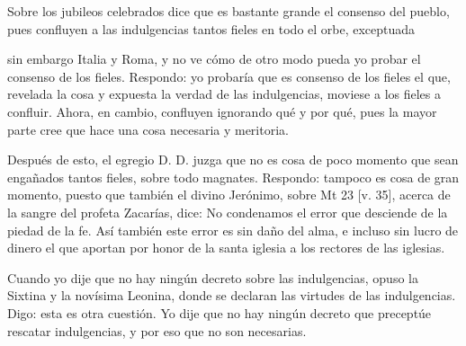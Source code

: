 Sobre los jubileos celebrados dice que es bastante grande el consenso del pueblo, pues confluyen a las indulgencias tantos fieles en todo el orbe, exceptuada

sin embargo Italia y Roma, y no ve cómo de otro modo pueda yo probar el consenso de los fieles. Respondo: yo probaría que es consenso de los fieles el que, revelada la cosa y expuesta la verdad de las indulgencias, moviese a los fieles a confluir. Ahora, en cambio, confluyen ignorando qué y por qué, pues la mayor parte cree que hace una cosa necesaria y meritoria.

Después de esto, el egregio D. D. juzga que no es cosa de poco momento que sean engañados tantos fieles, sobre todo magnates. Respondo: tampoco es cosa de gran momento, puesto que también el divino Jerónimo, sobre Mt 23 [v. 35], acerca de la sangre del profeta Zacarías, dice: No condenamos el error que desciende de la piedad de la fe. Así también este error es sin daño del alma, e incluso sin lucro de dinero el que aportan por honor de la santa iglesia a los rectores de las iglesias.

Cuando yo dije que no hay ningún decreto sobre las indulgencias, opuso la Sixtina y la novísima Leonina, donde se declaran las virtudes de las indulgencias. Digo: esta es otra cuestión. Yo dije que no hay ningún decreto que preceptúe rescatar indulgencias, y por eso que no son necesarias.

